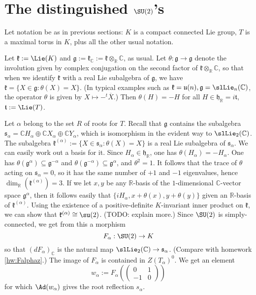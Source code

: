 \documentclass[reqno]{amsart} 
\begin{document}
\section{The distinguished \(\SU(2)\)'s\label{sec:distinguished-su2}}
\label{sec:org25cd375}
Let notation be as in previous sections: $K$ is a compact connected Lie group, $T$ is a maximal torus in $K$, plus all the other usual notation.

Let $\mathfrak{k} := \Lie(K)$ and $\mathfrak{g} := \mathfrak{k}_\mathbb{C} := \mathfrak{k} \otimes _{\mathbb{R}} \mathbb{C}$, as usual.  Let $\theta : \mathfrak{g} \rightarrow \mathfrak{g}$ denote the involution given by complex conjugation on the second factor of $\mathfrak{k} \otimes_{\mathbb{R}} \mathbb{C}$, so that when we identify $\mathfrak{k}$ with a real Lie subalgebra of $\mathfrak{g}$, we have $\mathfrak{k} = \{X \in \mathfrak{g} : \theta(X) = X\}$.  (In typical examples such as $\mathfrak{k} = \mathfrak{u}(n), \mathfrak{g} = \slLie_n(\mathbb{C})$, the operator $\theta$ is given by $X \mapsto -{}^t \overline{X}$.)  Then $\theta(H) = - H$ for all $H \in \mathfrak{h}_\mathbb{R} = i \mathfrak{t}$, $\mathfrak{t} := \Lie(T)$.

Let $\alpha$ belong to the set $R$ of roots for $T$.  Recall that $\mathfrak{g}$ contains the subalgebra $\mathfrak{s}_\alpha = \mathbb{C} H_\alpha \oplus \mathbb{C} X_\alpha \oplus \mathbb{C} Y_\alpha$, which is isomorphism in the evident way to $\slLie_2(\mathbb{C})$.  The subalgebra $\mathfrak{k}^{(\alpha)} := \{X \in \mathfrak{s}_\alpha : \theta(X) = X\}$ is a real Lie subalgebra of $\mathfrak{s}_\alpha$.  We can easily work out a basis for it.  Since $H_\alpha \in \mathfrak{h}_\mathbb{R}$, one has $\theta(H_\alpha) = - H_\alpha$.  One has $\theta (\mathfrak{g}^\alpha) \subseteq \mathfrak{g}^{-\alpha}$ and $\theta (\mathfrak{g}^{-\alpha}) \subseteq \mathfrak{g}^{\alpha}$, and $\theta^2 = 1$.  It follows that the trace of $\theta$ acting on $\mathfrak{s}_\alpha = 0$, so it has the same number of $+1$ and $-1$ eigenvalues, hence $\dim_{\mathbb{R}}(\mathfrak{k}^{(\alpha)}) = 3$.  If we let $x,y$ be any $\mathbb{R}$-basis of the $1$-dimensional $\mathbb{C}$-vector space $\mathfrak{g}^\alpha$, then it follows easily that $\{i H_\alpha, x + \theta(x), y + \theta(y)\}$ given an $\mathbb{R}$-basis of $\mathfrak{k}^{(\alpha)}$.  Using the existence of a positive-definite $K$-invariant inner product on $\mathfrak{k}$, we can show that $\mathfrak{k}^{(\alpha)} \cong \su(2)$.  (TODO: explain more.)  Since $\SU(2)$ is simply-connected, we get from this a morphism
\begin{equation*}
  F_\alpha : \SU(2) \rightarrow K
\end{equation*}
so that $(d F_\alpha)_\mathbb{C}$ is the natural map $\slLie_2(\mathbb{C}) \rightarrow \mathfrak{s}_\alpha$.  (Compare with homework \ref{hw:Falphaz}.)  The image of $F_\alpha$ is contained in $Z(T_\alpha)^0$.  We get an element
\begin{equation*}
  w_\alpha := F_\alpha (
\begin{pmatrix}
    0 & 1 \\
    -1 & 0
  \end{pmatrix}
  )
\end{equation*}
for which $\Ad(w_\alpha)$ gives the root reflection $s_\alpha$.
\end{document}

